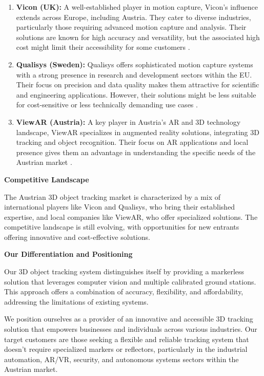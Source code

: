 \begin{enumerate}
	\item \textbf{Vicon (UK):} A well-established player in motion capture, Vicon's influence extends across Europe, including Austria. They cater to diverse industries, particularly those requiring advanced motion capture and analysis. Their solutions are known for high accuracy and versatility, but the associated high cost might limit their accessibility for some customers \cite{vicon_motion_systems_ltd}.
	
	\item \textbf{Qualisys (Sweden):} Qualisys offers sophisticated motion capture systems with a strong presence in research and development sectors within the EU. Their focus on precision and data quality makes them attractive for scientific and engineering applications. However, their solutions might be less suitable for cost-sensitive or less technically demanding use cases \cite{qualisys_motion_capture_systems}.
	
	\item \textbf{ViewAR (Austria):} A key player in Austria's AR and 3D technology landscape, ViewAR specializes in augmented reality solutions, integrating 3D tracking and object recognition. Their focus on AR applications and local presence gives them an advantage in understanding the specific needs of the Austrian market \cite{viewar_augmented_reality_solutions}. 
\end{enumerate}

\textbf{Competitive Landscape}

The Austrian 3D object tracking market is characterized by a mix of international players like Vicon and Qualisys, who bring their established expertise, and local companies like ViewAR, who offer specialized solutions. The competitive landscape is still evolving, with opportunities for new entrants offering innovative and cost-effective solutions.

\textbf{Our Differentiation and Positioning}

Our 3D object tracking system distinguishes itself by providing a markerless solution that leverages computer vision and multiple calibrated ground stations. This approach offers a combination of accuracy, flexibility, and affordability, addressing the limitations of existing systems.

We position ourselves as a provider of an innovative and accessible 3D tracking solution that empowers businesses and individuals across various industries. Our target customers are those seeking a flexible and reliable tracking system that doesn't require specialized markers or reflectors, particularly in the industrial automation, AR/VR, security, and autonomous systems sectors within the Austrian market.

